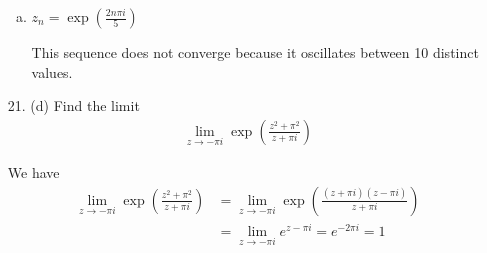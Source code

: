 \documentclass{article}
\begin{document}
\begin{itemize}
\begin{enumerate}[(a)]
			\item $z_n=\exp\left( \frac{2n\pi i}{5} \right)$
				\begin{soln}
					This sequence does not converge because it oscillates between 10 distinct values.
				\end{soln}
				
		\end{enumerate}

	\item[21.] (d) Find the limit
		\begin{align*}
			\lim_{z\to-\pi i} \exp\left( \frac{z^2+\pi^2}{z+\pi i} \right)
		\end{align*}
		\begin{soln}
			We have
			\begin{align*}
				\lim_{z\to-\pi i} \exp\left( \frac{z^2+\pi^2}{z+\pi i} \right) &= \lim_{z\to-\pi i} \exp\left( \frac{(z+\pi i)(z-\pi i)}{z + \pi i} \right) \\
				&= \lim_{z\to-\pi i} e^{z-\pi i} = e^{-2\pi i} = 1
			\end{align*}
		\end{soln}
		
\end{itemize}
\end{document}
